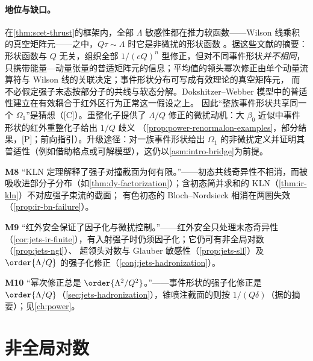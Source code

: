 \paragraph{地位与缺口。}
在\cref{thm:scet-thrust}的框架内，全部 $\Lambda$ 敏感性都在推力软函数——Wilson 线乘积的真空矩阵元——之中，$Q\tau\sim\Lambda$ 时它是非微扰的形状函数
\cite{Korchemsky:1994is,Korchemsky:1999kt,Bauer:2003di,Lee:2006nr,Bauer:2008dt}。据这些文献的摘要：形状函数与 $Q$ 无关，组织全部 $1/(eQ)^n$ 型修正，但对不同事件形状\emph{并不相同}，
只携带能量—动量张量的普适矩阵元的信息\cite{Korchemsky:1999kt}；平均值的领头幂次修正由单个动量流算符与 Wilson 线的关联决定\cite{Lee:2006nr}；事件形状分布可写成有效理论的真空矩阵元，
而不必假定强子末态按部分子的共线与软态分解\cite{Bauer:2008dt}。Dokshitzer--Webber 模型中的普适性建立在有效耦合于红外区行为正常这一假设之上\cite{DokshitzerWebber1995}。
因此“整族事件形状共享同一个 $\Omega_1$”是猜想（[C]）。重整化子提供了 $\Lambda/Q$ 修正的微扰动机：大 $\beta_0$ 近似中事件形状的红外重整化子给出 $1/Q$ 歧义
（\cref{prop:power-renormalon-examples}，部分结果，[P]；前向指引）。升级途径：对一族事件形状给出 $\Omega_1$ 的非微扰定义并证明其普适性（例如借助格点或可解模型），这仍以\cref{asm:intro-bridge}为前提。

\begin{tcolorbox}[enhanced,breakable,title=常见误解（M8、M9、M10）,fonttitle=\bfseries,
  colback=gray!3!white,colframe=gray!55!black,boxrule=0.6pt,arc=2pt,
  left=5pt,right=5pt,top=3pt,bottom=3pt,before skip=6pt,after skip=6pt]
\textbf{M8} “KLN 定理解释了强子对撞截面为何有限。”——初态共线奇异性不相消，而被吸收进部分子分布（如\cref{thm:dy-factorization}）；含初态简并求和的 KLN（\cref{thm:ir-kln}）不对应强子束流的截面；
有色初态的 Bloch--Nordsieck 相消在两圈失效（\cref{prop:ir-bn-failure}）。\par
\textbf{M9} “红外安全保证了因子化与微扰控制。”——红外安全只处理末态奇异性（\cref{cor:jets-ir-finite}），有入射强子时仍须因子化；它仍可有非全局对数（\cref{prop:jets-ngl}）、
超领头对数与 Glauber 敏感性（\cref{prop:jets-sll}）及 $\order{\Lambda/Q}$ 的强子化修正（\cref{conj:jets-hadronization}）。\par
\textbf{M10} “幂次修正总是 $\order{\Lambda^2/Q^2}$。”——事件形状的强子化修正是 $\order{\Lambda/Q}$（\cref{sec:jets-hadronization}），锥喷注截面的则按 $1/(Q\delta)$（据\cite{Korchemsky:1994is}的摘要）；见\cref{ch:power}。
\end{tcolorbox}
\section{非全局对数}\label{sec:jets-ngl}

